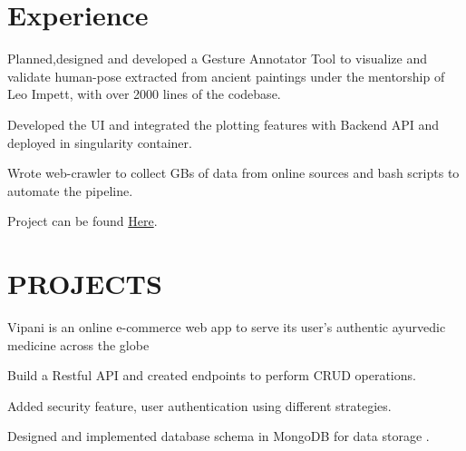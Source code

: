\documentclass[]{deedy-resume-openfont}
\begin{document}
\hfill
\begin{minipage}[t]{0.66\textwidth} 


\section{Experience}

\vspace{\topsep} %
\begin{tightemize}\item Planned,designed and developed a Gesture Annotator Tool to visualize and
validate human-pose extracted from ancient paintings under the mentorship of Leo Impett, with over 2000 lines of the codebase.
\item Developed the UI and integrated the plotting features with Backend API and deployed in singularity container.
\item Wrote web-crawler to collect GBs of data from online sources and bash scripts
to automate the pipeline.
\item Project can be found  \href{https://summerofcode.withgoogle.com/archive/2019/projects/5565179075493888/}{Here}.
\end{tightemize}
\sectionsep

\sectionsep


\section{PROJECTS}
Vipani is an online e-commerce web app to serve its user’s authentic ayurvedic
medicine across the globe
\begin{tightemize}
\item Build a Restful API and created endpoints to perform CRUD operations.
\item Added security feature, user authentication using different strategies.
\item Designed and implemented database schema in MongoDB for data storage .
\end{tightemize}
\sectionsep


\end{minipage}
\end{document}
